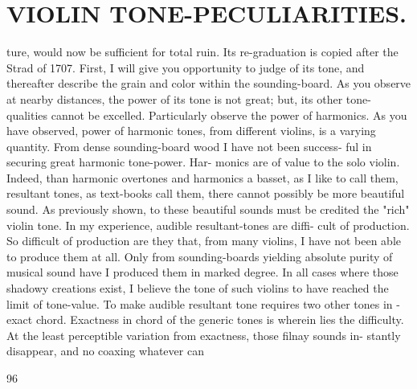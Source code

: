 \documentclass{article}
\begin{document}
\section*{VIOLIN TONE-PECULIARITIES.}
ture, would now be sufficient for total ruin. Its re-graduation is copied after the Strad of 1707. First, I will give you opportunity to judge of its tone, and thereafter describe the grain and color within the sounding-board. As you observe at nearby distances, the power of its tone is not great; but, its other tone-qualities cannot be excelled. Particularly observe the power of harmonics. As you have observed, power of harmonic tones, from different violins, is a varying quantity. From dense sounding-board wood I have not been success- ful in securing great harmonic tone-power. Har- monics are of value to the solo violin. Indeed, than harmonic overtones and harmonics a basset, as I like to call them, resultant tones, as text-books call them, there cannot possibly be more beautiful sound. As previously shown, to these beautiful sounds must be credited the "rich" violin tone. In my experience, audible resultant-tones are diffi- cult of production. So difficult of production are they that, from many violins, I have not been able to produce them at all. Only from sounding-boards yielding absolute purity of musical sound have I produced them in marked degree. In all cases where those shadowy creations exist, I believe the tone of such violins to have reached the limit of tone-value. To make audible resultant tone requires two other tones in -exact chord. Exactness in chord of the generic tones is wherein lies the difficulty. At the least perceptible variation from exactness, those filnay sounds in- stantly disappear, and no coaxing whatever can

96
\end{document}
